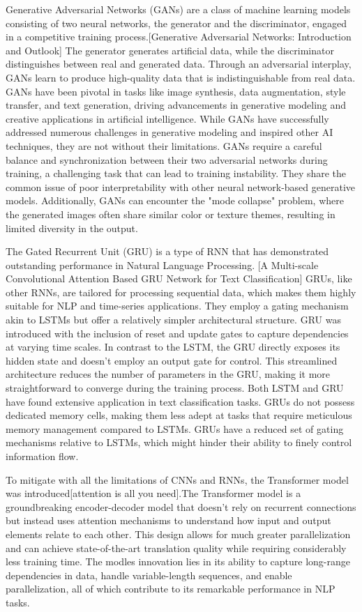 \documentclass[conference]{IEEEtran}
\begin{document}
Generative Adversarial Networks (GANs) are a class of machine learning models consisting of two neural networks, the generator and the discriminator, engaged in a competitive training process.[Generative Adversarial Networks: Introduction and Outlook] The generator generates artificial data, while the discriminator distinguishes between real and generated data. Through an adversarial interplay, GANs learn to produce high-quality data that is indistinguishable from real data. GANs have been pivotal in tasks like image synthesis, data augmentation, style transfer, and text generation, driving advancements in generative modeling and creative applications in artificial intelligence. While GANs have successfully addressed numerous challenges in generative modeling and inspired other AI techniques, they are not without their limitations. GANs require a careful balance and synchronization between their two adversarial networks during training, a challenging task that can lead to training instability. They share the common issue of poor interpretability with other neural network-based generative models. Additionally, GANs can encounter the "mode collapse" problem, where the generated images often share similar color or texture themes, resulting in limited diversity in the output.

The Gated Recurrent Unit (GRU) is a type of RNN that has demonstrated outstanding performance in Natural Language Processing. [A Multi-scale Convolutional Attention Based GRU Network for Text Classification] GRUs, like other RNNs, are tailored for processing sequential data, which makes them highly suitable for NLP and time-series applications. They employ a gating mechanism akin to LSTMs but offer a relatively simpler architectural structure. GRU was introduced with the inclusion of reset and update gates to capture dependencies at varying time scales. In contrast to the LSTM, the GRU directly exposes its hidden state and doesn't employ an output gate for control. This streamlined architecture reduces the number of parameters in the GRU, making it more straightforward to converge during the training process. Both LSTM and GRU have found extensive application in text classification tasks. GRUs do not possess dedicated memory cells, making them less adept at tasks that require meticulous memory management compared to LSTMs. GRUs have a reduced set of gating mechanisms relative to LSTMs, which might hinder their ability to finely control information flow.



To mitigate with all the limitations of CNNs and RNNs, the Transformer model was introduced[attention is all you need].The Transformer model is a groundbreaking encoder-decoder model that doesn't rely on recurrent connections but instead uses attention mechanisms to understand how input and output elements relate to each other. This design allows for much greater parallelization and can achieve state-of-the-art translation quality while requiring considerably less training time. The modles innovation lies in its ability to capture long-range dependencies in data, handle variable-length sequences, and enable parallelization, all of which contribute to its remarkable performance in NLP tasks. 
\end{document}
